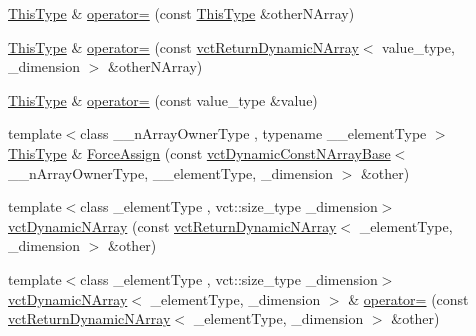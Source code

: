 \begin{DoxyCompactItemize}
\item 
\hyperlink{classvct_dynamic_const_n_array_base_a5123caffcf1455a1b99003877eade897}{This\+Type} \& \hyperlink{classvct_dynamic_n_array_a8ccc195be994b978578b5aa25ff1698f}{operator=} (const \hyperlink{classvct_dynamic_const_n_array_base_a5123caffcf1455a1b99003877eade897}{This\+Type} \&other\+N\+Array)
\item 
\hyperlink{classvct_dynamic_const_n_array_base_a5123caffcf1455a1b99003877eade897}{This\+Type} \& \hyperlink{classvct_dynamic_n_array_a46790594f24b17dd1f5c808210cf36c8}{operator=} (const \hyperlink{classvct_return_dynamic_n_array}{vct\+Return\+Dynamic\+N\+Array}$<$ value\+\_\+type, \+\_\+dimension $>$ \&other\+N\+Array)
\item 
\hyperlink{classvct_dynamic_const_n_array_base_a5123caffcf1455a1b99003877eade897}{This\+Type} \& \hyperlink{classvct_dynamic_n_array_a4ce29de727ea0de98fdc92f68323fa7a}{operator=} (const value\+\_\+type \&value)
\item 
{\footnotesize template$<$class \+\_\+\+\_\+n\+Array\+Owner\+Type , typename \+\_\+\+\_\+element\+Type $>$ }\\\hyperlink{classvct_dynamic_const_n_array_base_a5123caffcf1455a1b99003877eade897}{This\+Type} \& \hyperlink{classvct_dynamic_n_array_a47f9ca5721cafaebe1562a98f946e276}{Force\+Assign} (const \hyperlink{classvct_dynamic_const_n_array_base}{vct\+Dynamic\+Const\+N\+Array\+Base}$<$ \+\_\+\+\_\+n\+Array\+Owner\+Type, \+\_\+\+\_\+element\+Type, \+\_\+dimension $>$ \&other)
\item 
{\footnotesize template$<$class \+\_\+element\+Type , vct\+::size\+\_\+type \+\_\+dimension$>$ }\\\hyperlink{classvct_dynamic_n_array_ace2a0ad0e87d96180509314c0b8afe13}{vct\+Dynamic\+N\+Array} (const \hyperlink{classvct_return_dynamic_n_array}{vct\+Return\+Dynamic\+N\+Array}$<$ \+\_\+element\+Type, \+\_\+dimension $>$ \&other)
\item 
{\footnotesize template$<$class \+\_\+element\+Type , vct\+::size\+\_\+type \+\_\+dimension$>$ }\\\hyperlink{classvct_dynamic_n_array}{vct\+Dynamic\+N\+Array}$<$ \+\_\+element\+Type, \+\_\+dimension $>$ \& \hyperlink{classvct_dynamic_n_array_a92e670ef0bfe55c12f2be1b0e857da07}{operator=} (const \hyperlink{classvct_return_dynamic_n_array}{vct\+Return\+Dynamic\+N\+Array}$<$ \+\_\+element\+Type, \+\_\+dimension $>$ \&other)
\end{DoxyCompactItemize}
{\bf }\par
